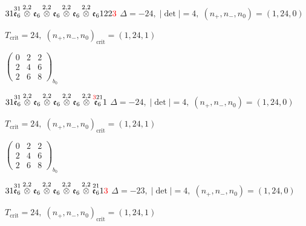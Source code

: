 \documentclass[10pt]{article}
\begin{document}
\smallskip

$31\overset{31}{\mathfrak{e}_6}\overset{2,2}{\otimes}\mathfrak{e}_6\overset{2,2}{\otimes}\mathfrak{e}_6\overset{2,2}{\otimes}\mathfrak{e}_6\overset{2,2}{\otimes}\mathfrak{e}_6122\textcolor{red}{3}$ \quad $\Delta=-24,\; |\det|=4,\; (n_+,n_-,n_0)=(1,24,0)$

\hspace{1em}$T_{\text{crit}}=24,\; (n_+,n_-,n_0)_{\text{crit}}=(1,24,1)$

\hspace{2em}$\left(\begin{smallmatrix}0 & 2 & 2 \\ 2 & 4 & 6 \\ 2 & 6 & 8\end{smallmatrix}\right)_{\!b_0}$

\smallskip

$31\overset{31}{\mathfrak{e}_6}\overset{2,2}{\otimes}\mathfrak{e}_6\overset{2,2}{\otimes}\mathfrak{e}_6\overset{2,2}{\otimes}\mathfrak{e}_6\overset{2,2}{\otimes}\overset{\textcolor{red}{3}21}{\mathfrak{e}_6}1$ \quad $\Delta=-24,\; |\det|=4,\; (n_+,n_-,n_0)=(1,24,0)$

\hspace{1em}$T_{\text{crit}}=24,\; (n_+,n_-,n_0)_{\text{crit}}=(1,24,1)$

\hspace{2em}$\left(\begin{smallmatrix}0 & 2 & 2 \\ 2 & 4 & 6 \\ 2 & 6 & 8\end{smallmatrix}\right)_{\!b_0}$

$31\overset{31}{\mathfrak{e}_6}\overset{2,2}{\otimes}\mathfrak{e}_6\overset{2,2}{\otimes}\mathfrak{e}_6\overset{2,2}{\otimes}\mathfrak{e}_6\overset{2,2}{\otimes}\overset{21}{\mathfrak{e}_6}1\textcolor{red}{3}$ \quad $\Delta=-23,\; |\det|=4,\; (n_+,n_-,n_0)=(1,24,0)$

\hspace{1em}$T_{\text{crit}}=24,\; (n_+,n_-,n_0)_{\text{crit}}=(1,24,1)$
\end{document}
